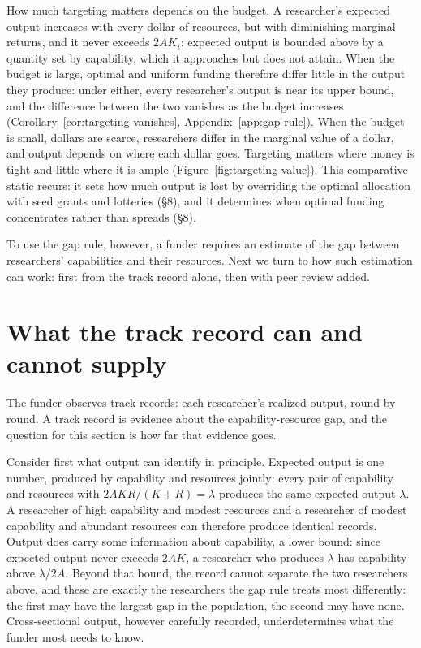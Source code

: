 \documentclass[article, 11pt, reqno]{amsart}
\theoremstyle{named}
\begin{document}
How much targeting matters depends on the budget. A researcher's expected output increases
with every dollar of resources, but with diminishing marginal returns, and it never
exceeds $2AK_i$: expected output is bounded above by a quantity set by capability, which
it approaches but does not attain. When the budget is large, optimal and uniform funding
therefore differ little in the output they produce: under either, every researcher's
output is near its upper bound, and the difference between the two vanishes as the budget
increases (Corollary~\ref{cor:targeting-vanishes}, Appendix~\ref{app:gap-rule}). When the budget is small, dollars are scarce, researchers differ
in the marginal value of a dollar, and output depends on where each dollar goes. Targeting
matters where money is tight and little where it is ample
(Figure~\ref{fig:targeting-value}). This comparative static recurs: it sets how much output is
lost by overriding the optimal allocation with seed grants and lotteries (\S8), and it determines when
optimal funding concentrates rather than spreads (\S8).



To use the gap rule, however, a funder requires an estimate of the gap between
researchers' capabilities and their resources. Next we turn to how such estimation can
work: first from the track record alone, then with peer review added.

\section{What the track record can and cannot supply}\label{sec:records}

The funder observes track records: each researcher's realized output, round by round. A
track record is evidence about the capability-resource gap, and the question for this
section is how far that evidence goes.

Consider first what output can identify in principle. Expected output is one number,
produced by capability and resources jointly: every pair of capability and resources with
$2AKR/(K+R) = \lambda$ produces the same expected output $\lambda$. A researcher of high
capability and modest resources and a researcher of modest capability and abundant
resources can therefore produce identical records. Output does carry some information
about capability, a lower bound: since expected output never exceeds $2AK$, a researcher
who produces $\lambda$ has capability above $\lambda/2A$. Beyond that bound, the record
cannot separate the two researchers above, and these are exactly the researchers the gap
rule treats most differently: the first may have the largest gap in the population, the
second may have none. Cross-sectional output, however carefully recorded, underdetermines
what the funder most needs to know.
\end{document}
